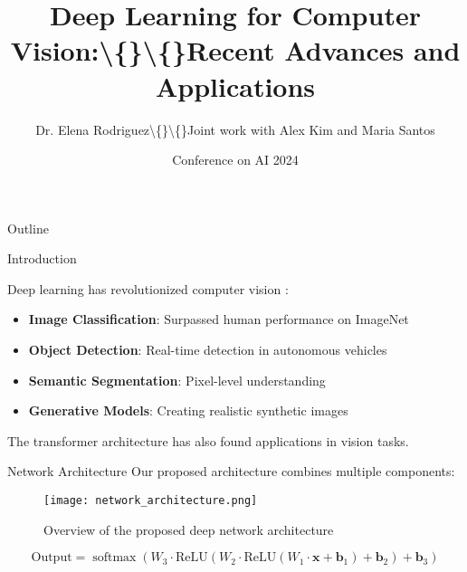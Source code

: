 \documentclass[11pt,16:9,handout]{beamer}
\title{Deep Learning for Computer Vision:\textbackslash\{\}\textbackslash\{\}Recent Advances and Applications}
\author{Dr. Elena Rodriguez\textbackslash\{\}\textbackslash\{\}Joint work with Alex Kim and Maria Santos}
\institute{AI Research Lab\\Institute of Technology}
\date{Conference on AI 2024}
\DeclareMathOperator{\softmax}{softmax}
\begin{document}
\begin{frame}
    \titlepage
\end{frame}


\begin{frame}{Outline}
    \tableofcontents
\end{frame}



\begin{frame}[fragile]{Introduction}

            Deep learning has revolutionized computer vision \cite{lecun2015deep}:
            
\begin{itemize}
  \item \textbf{Image Classification}: Surpassed human performance on ImageNet
  \item \textbf{Object Detection}: Real-time detection in autonomous vehicles
  \item \textbf{Semantic Segmentation}: Pixel-level understanding
  \item \textbf{Generative Models}: Creating realistic synthetic images
\end{itemize}
            
            The transformer architecture \cite{attention2017} has also found applications in vision tasks.
            

\end{frame}



\begin{frame}{Network Architecture}
Our proposed architecture combines multiple components:


\begin{figure}[center]
    \centering
    \texttt{[image: network\_architecture.png]}
    \caption{Overview of the proposed deep network architecture}
    \label{fig:architecture}
\end{figure}


\begin{equation}
\text{Output} = \softmax(W_3 \cdot \text{ReLU}(W_2 \cdot \text{ReLU}(W_1 \cdot \mathbf{x} + \mathbf{b}_1) + \mathbf{b}_2) + \mathbf{b}_3)
\end{equation}

\end{frame}
\end{document}
